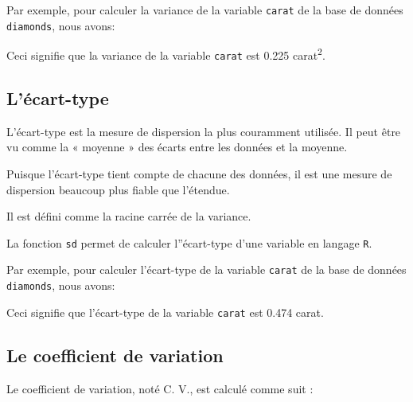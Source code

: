 \documentclass[]{book}
\newenvironment{Shaded}{\begin{snugshade}}{\end{snugshade}}
\newcommand{\KeywordTok}[1]{\textcolor[rgb]{0.13,0.29,0.53}{\textbf{#1}}}
\newcommand{\NormalTok}[1]{#1}
\newcommand{\OperatorTok}[1]{\textcolor[rgb]{0.81,0.36,0.00}{\textbf{#1}}}
\theoremstyle{definition}
\theoremstyle{definition}
\theoremstyle{definition}
\theoremstyle{remark}
\begin{document}
Par exemple, pour calculer la variance de la variable \texttt{carat} de
la base de données \texttt{diamonds}, nous avons:

\begin{Shaded}
\end{Shaded}

Ceci signifie que la variance de la variable \texttt{carat} est 0.225
carat\textsuperscript{2}.

\hypertarget{lecart-type}{%
\subsection{L'écart-type}\label{lecart-type}}

L'écart-type est la mesure de dispersion la plus couramment utilisée. Il
peut être vu comme la « moyenne » des écarts entre les données et la
moyenne.

Puisque l'écart-type tient compte de chacune des données, il est une
mesure de dispersion beaucoup plus fiable que l'étendue.

Il est défini comme la racine carrée de la variance.

La fonction \texttt{sd} permet de calculer l''écart-type d'une variable
en langage \texttt{R}.

Par exemple, pour calculer l'écart-type de la variable \texttt{carat} de
la base de données \texttt{diamonds}, nous avons:

\begin{Shaded}
\end{Shaded}

Ceci signifie que l'écart-type de la variable \texttt{carat} est 0.474
carat.

\hypertarget{le-coefficient-de-variation}{%
\subsection{Le coefficient de
variation}\label{le-coefficient-de-variation}}

Le coefficient de variation, noté C. V., est calculé comme suit :
\end{document}
